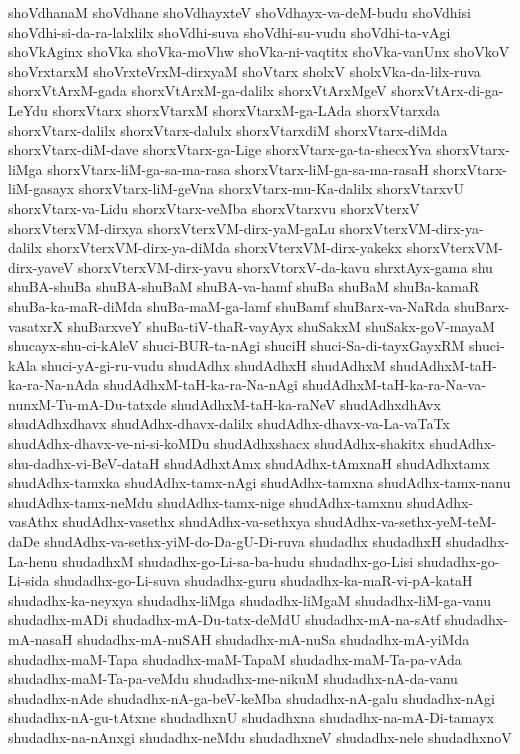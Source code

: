 {shoVdhanaM
shoVdhane
shoVdhayxteV
shoVdhayx-va-deM-budu
shoVdhisi
shoVdhi-si-da-ra-lalxlilx
shoVdhi-suva
shoVdhi-su-vudu
shoVdhi-ta-vAgi
shoVkAginx
shoVka
shoVka-moVhw
shoVka-ni-vaqtitx
shoVka-vanUnx
shoVkoV
shoVrxtarxM
shoVrxteVrxM-dirxyaM
shoVtarx
sholxV
sholxVka-da-lilx-ruva
shorxVtArxM-gada
shorxVtArxM-ga-dalilx
shorxVtArxMgeV
shorxVtArx-di-ga-LeYdu
shorxVtarx
shorxVtarxM
shorxVtarxM-ga-LAda
shorxVtarxda
shorxVtarx-dalilx
shorxVtarx-dalulx
shorxVtarxdiM
shorxVtarx-diMda
shorxVtarx-diM-dave
shorxVtarx-ga-Lige
shorxVtarx-ga-ta-shecxYva
shorxVtarx-liMga
shorxVtarx-liM-ga-sa-ma-rasa
shorxVtarx-liM-ga-sa-ma-rasaH
shorxVtarx-liM-gasayx
shorxVtarx-liM-geVna
shorxVtarx-mu-Ka-dalilx
shorxVtarxvU
shorxVtarx-va-Lidu
shorxVtarx-veMba
shorxVtarxvu
shorxVterxV
shorxVterxVM-dirxya
shorxVterxVM-dirx-yaM-gaLu
shorxVterxVM-dirx-ya-dalilx
shorxVterxVM-dirx-ya-diMda
shorxVterxVM-dirx-yakekx
shorxVterxVM-dirx-yaveV
shorxVterxVM-dirx-yavu
shorxVtorxV-da-kavu
shrxtAyx-gama
shu
shuBA-shuBa
shuBA-shuBaM
shuBA-va-hamf
shuBa
shuBaM
shuBa-kamaR
shuBa-ka-maR-diMda
shuBa-maM-ga-lamf
shuBamf
shuBarx-va-NaRda
shuBarx-vasatxrX
shuBarxveY
shuBa-tiV-thaR-vayAyx
shuSakxM
shuSakx-goV-mayaM
shucayx-shu-ci-kAleV
shuci-BUR-ta-nAgi
shuciH
shuci-Sa-di-tayxGayxRM
shuci-kAla
shuci-yA-gi-ru-vudu
shudAdhx
shudAdhxH
shudAdhxM
shudAdhxM-taH-ka-ra-Na-nAda
shudAdhxM-taH-ka-ra-Na-nAgi
shudAdhxM-taH-ka-ra-Na-va-nunxM-Tu-mA-Du-tatxde
shudAdhxM-taH-ka-raNeV
shudAdhxdhAvx
shudAdhxdhavx
shudAdhx-dhavx-dalilx
shudAdhx-dhavx-va-La-vaTaTx
shudAdhx-dhavx-ve-ni-si-koMDu
shudAdhxshacx
shudAdhx-shakitx
shudAdhx-shu-dadhx-vi-BeV-dataH
shudAdhxtAmx
shudAdhx-tAmxnaH
shudAdhxtamx
shudAdhx-tamxka
shudAdhx-tamx-nAgi
shudAdhx-tamxna
shudAdhx-tamx-nanu
shudAdhx-tamx-neMdu
shudAdhx-tamx-nige
shudAdhx-tamxnu
shudAdhx-vasAthx
shudAdhx-vasethx
shudAdhx-va-sethxya
shudAdhx-va-sethx-yeM-teM-daDe
shudAdhx-va-sethx-yiM-do-Da-gU-Di-ruva
shudadhx
shudadhxH
shudadhx-La-henu
shudadhxM
shudadhx-go-Li-sa-ba-hudu
shudadhx-go-Lisi
shudadhx-go-Li-sida
shudadhx-go-Li-suva
shudadhx-guru
shudadhx-ka-maR-vi-pA-kataH
shudadhx-ka-neyxya
shudadhx-liMga
shudadhx-liMgaM
shudadhx-liM-ga-vanu
shudadhx-mADi
shudadhx-mA-Du-tatx-deMdU
shudadhx-mA-na-sAtf
shudadhx-mA-nasaH
shudadhx-mA-nuSAH
shudadhx-mA-nuSa
shudadhx-mA-yiMda
shudadhx-maM-Tapa
shudadhx-maM-TapaM
shudadhx-maM-Ta-pa-vAda
shudadhx-maM-Ta-pa-veMdu
shudadhx-me-nikuM
shudadhx-nA-da-vanu
shudadhx-nAde
shudadhx-nA-ga-beV-keMba
shudadhx-nA-galu
shudadhx-nAgi
shudadhx-nA-gu-tAtxne
shudadhxnU
shudadhxna
shudadhx-na-mA-Di-tamayx
shudadhx-na-nAnxgi
shudadhx-neMdu
shudadhxneV
shudadhx-nele
shudadhxnoV
}
